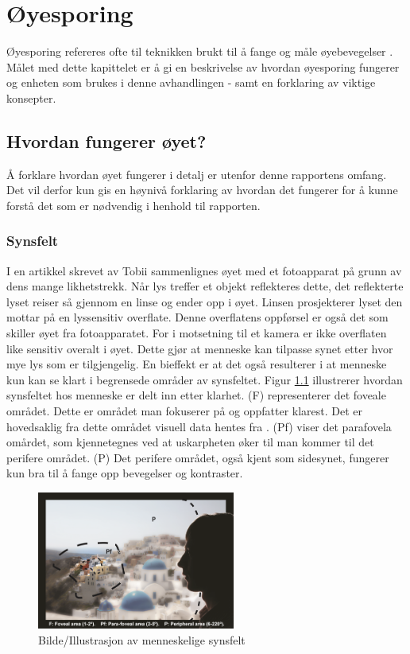 \documentclass[phd,tocprelim]{cornell}
\begin{document}
\chapter{Øyesporing}

Øyesporing refereres ofte til teknikken brukt til å fange og måle øyebevegelser \cite{Calibration}. Målet med dette kapittelet er å gi en beskrivelse av hvordan øyesporing fungerer og enheten som brukes i denne avhandlingen - samt en forklaring av viktige konsepter.


\section{Hvordan fungerer øyet?}

Å forklare hvordan øyet fungerer i detalj er utenfor denne rapportens omfang. Det vil derfor kun gis en høynivå forklaring av hvordan det fungerer for å kunne forstå det som er nødvendig i henhold til rapporten. 

\subsection{Synsfelt}

I en artikkel skrevet av Tobii \cite{Calibration} sammenlignes øyet med et fotoapparat på grunn av dens mange likhetstrekk. Når lys treffer et objekt reflekteres dette, det reflekterte lyset reiser så gjennom en linse og ender opp i øyet. Linsen prosjekterer lyset den mottar på en lyssensitiv overflate. Denne overflatens oppførsel er også det som skiller øyet fra fotoapparatet. For i motsetning til et kamera er ikke overflaten like sensitiv overalt i øyet.  Dette gjør at menneske kan tilpasse synet etter hvor mye lys som er tilgjengelig. En bieffekt er at det også resulterer i at menneske kun kan se klart i begrensede områder av synsfeltet. Figur \ref{fig:visueltArea} illustrerer hvordan synsfeltet hos menneske er delt inn etter klarhet. (F) representerer det foveale området. Dette er området man fokuserer på og oppfatter klarest. Det er hovedsaklig fra dette området visuell data hentes fra . (Pf) viser det parafovela omårdet, som kjennetegnes ved at uskarpheten øker til man kommer til det perifere området. (P) Det perifere området, også kjent som sidesynet, fungerer kun bra til å fange opp bevegelser og kontraster.

\begin{figure}[ht!]
\centering
\includegraphics[width=65mm]{fovealArea}
\caption{Bilde/Illustrasjon av menneskelige synsfelt \cite{VisualImage}}
\label{fig:visueltArea}
\end{figure}
\end{document}
